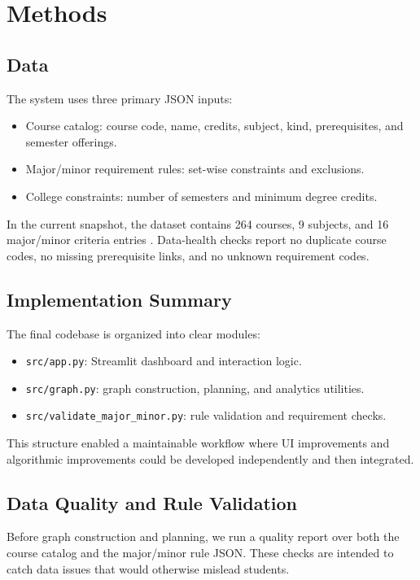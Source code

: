\section{Methods}
\subsection{Data}
The system uses three primary JSON inputs:

\begin{itemize}
    \item Course catalog: course code, name, credits, subject, kind,
    prerequisites, and semester offerings.
    \item Major/minor requirement rules: set-wise constraints and exclusions.
    \item College constraints: number of semesters and minimum degree credits.
\end{itemize}

In the current snapshot, the dataset contains 264 courses, 9 subjects, and 16
major/minor criteria entries \citep{iiser_data}. Data-health checks report no
duplicate course codes, no missing prerequisite links, and no unknown
requirement codes.

\subsection{Implementation Summary}
The final codebase is organized into clear modules:

\begin{itemize}
    \item \texttt{src/app.py}: Streamlit dashboard and interaction logic.
    \item \texttt{src/graph.py}: graph construction, planning, and analytics
    utilities.
    \item \texttt{src/validate\_major\_minor.py}: rule validation and
    requirement checks.
\end{itemize}

This structure enabled a maintainable workflow where UI improvements and
algorithmic improvements could be developed independently and then integrated.

\subsection{Data Quality and Rule Validation}
Before graph construction and planning, we run a quality report over both the
course catalog and the major/minor rule JSON. These checks are intended to
catch data issues that would otherwise mislead students.

